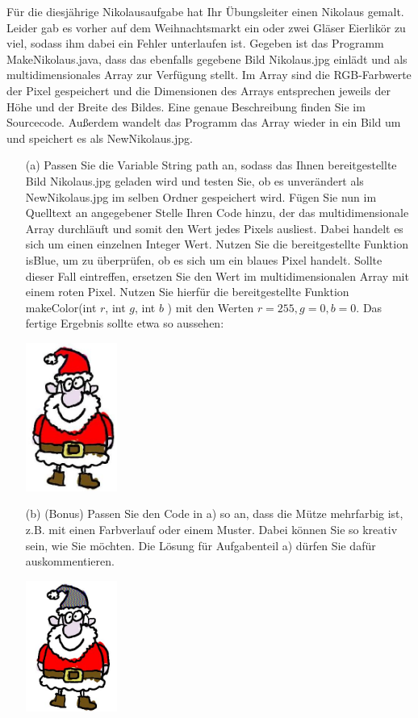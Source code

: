 Für die diesjährige Nikolausaufgabe hat Ihr Übungsleiter einen Nikolaus gemalt. Leider gab es vorher auf dem Weihnachtsmarkt ein oder zwei Gläser Eierlikör zu viel, sodass ihm dabei ein Fehler unterlaufen ist. Gegeben ist das Programm MakeNikolaus.java, dass das ebenfalls gegebene Bild Nikolaus.jpg einlädt und als multidimensionales Array zur Verfügung stellt. Im Array sind die RGB-Farbwerte der Pixel gespeichert und die Dimensionen des Arrays entsprechen jeweils der Höhe und der Breite des Bildes. Eine genaue Beschreibung finden Sie im Sourcecode. Außerdem wandelt das Programm das Array wieder in ein Bild um und speichert es als NewNikolaus.jpg.
\begin{itemize}
  \item [(a)] Passen Sie die Variable String path an, sodass das Ihnen bereitgestellte Bild Nikolaus.jpg geladen wird und testen Sie, ob es unverändert als NewNikolaus.jpg im selben Ordner gespeichert wird. Fügen Sie nun im Quelltext an angegebener Stelle Ihren Code hinzu, der das multidimensionale Array durchläuft und somit den Wert jedes Pixels ausliest. Dabei handelt es sich um einen einzelnen Integer Wert. Nutzen Sie die bereitgestellte Funktion isBlue, um zu überprüfen, ob es sich um ein blaues Pixel handelt. Sollte dieser Fall eintreffen, ersetzen Sie den Wert im multidimensionalen Array mit einem roten Pixel. Nutzen Sie hierfür die bereitgestellte Funktion makeColor(int $r$, int $g$, int $b$ ) mit den Werten $r=255, g=0, b=0$. Das fertige Ergebnis sollte etwa so aussehen:

  \begin{center}
  \includegraphics[width=3cm]{2022_12_05_3f6eb410f05a7976cd28g-3}
  \end{center}
  
  \item [(b)] (Bonus) Passen Sie den Code in a) so an, dass die Mütze mehrfarbig ist, z.B. mit einen Farbverlauf oder einem Muster. Dabei können Sie so kreativ sein, wie Sie möchten. Die Lösung für Aufgabenteil a) dürfen Sie dafür auskommentieren.
  
  \begin{center}
    \includegraphics[width=3cm]{NewNikolaus.jpg}
    \end{center}

\end{itemize}

\newpage

\begin{itemize}
  \item [] \inputminted[]{Java}{MakeNikolaus.java}
\end{itemize}

